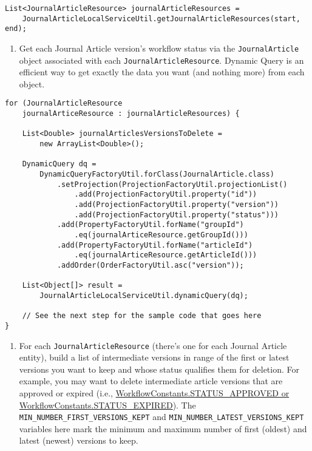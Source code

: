 \begin{enumerate}
\begin{verbatim}
List<JournalArticleResource> journalArticleResources = 
    JournalArticleLocalServiceUtil.getJournalArticleResources(start, end);
\end{verbatim}

  \begin{enumerate}
  \def\labelenumii{\arabic{enumii}.}
  \setcounter{enumii}{1}
  \item
    Get each Journal Article version's workflow status via the
    \texttt{JournalArticle} object associated with each
    \texttt{JournalArticleResource}. Dynamic Query is an efficient way
    to get exactly the data you want (and nothing more) from each
    object.
  \end{enumerate}

\begin{verbatim}
for (JournalArticleResource
    journalArticeResource : journalArticleResources) {

    List<Double> journalArticlesVersionsToDelete =
        new ArrayList<Double>();

    DynamicQuery dq =
        DynamicQueryFactoryUtil.forClass(JournalArticle.class)
            .setProjection(ProjectionFactoryUtil.projectionList()
                .add(ProjectionFactoryUtil.property("id"))
                .add(ProjectionFactoryUtil.property("version"))
                .add(ProjectionFactoryUtil.property("status")))
            .add(PropertyFactoryUtil.forName("groupId")
                .eq(journalArticeResource.getGroupId()))
            .add(PropertyFactoryUtil.forName("articleId")
                .eq(journalArticeResource.getArticleId()))
            .addOrder(OrderFactoryUtil.asc("version"));

    List<Object[]> result =
        JournalArticleLocalServiceUtil.dynamicQuery(dq);

    // See the next step for the sample code that goes here
}
\end{verbatim}

  \begin{enumerate}
  \def\labelenumii{\arabic{enumii}.}
  \setcounter{enumii}{2}
  \tightlist
  \item
    For each \texttt{JournalArticleResource} (there's one for each
    Journal Article entity), build a list of intermediate versions in
    range of the first or latest versions you want to keep and whose
    status qualifies them for deletion. For example, you may want to
    delete intermediate article versions that are approved or expired
    (i.e.,
    \href{https://docs.liferay.com/dxp/portal/7.2-latest/javadocs/portal-kernel/com/liferay/portal/kernel/workflow/WorkflowConstants.html}{WorkflowConstants.STATUS\_APPROVED
    or WorkflowConstants.STATUS\_EXPIRED}). The
    \texttt{MIN\_NUMBER\_FIRST\_VERSIONS\_KEPT} and
    \texttt{MIN\_NUMBER\_LATEST\_VERSIONS\_KEPT} variables here mark the
    minimum and maximum number of first (oldest) and latest (newest)
    versions to keep.
  \end{enumerate}


\end{enumerate}
